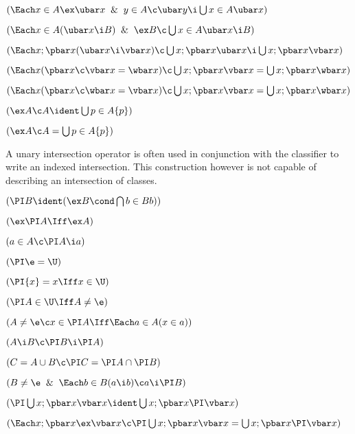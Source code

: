  $(\Each x \in A \ex\ubar x \And y \in A
\c \ubar y \i \bigcup x \in A \ubar x)$

 $(\Each x \in A (\ubar x \i B) \And \ex B
\c \bigcup x \in A \ubar x \i B)$

 $(\Each x ;\pbar x (\ubar x \i \vbar x )\c \bigcup x ; \pbar x \ubar x \i \bigcup x; \pbar x \vbar x)$


 $(\Each x (\pbar x \c \vbar x = \wbar x )\c \bigcup x ; \pbar x \vbar x = \bigcup x; \pbar x \wbar x)$

 $(\Each x (\pbar x \c \wbar x = \vbar x )\c \bigcup x ; \pbar x \vbar x = \bigcup x; \pbar x \wbar x)$

 $(\ex A \c A \ident \bigcup p \in A \{p\})$

 $(\ex A \c A = \bigcup p \in A \{p\})$
\lineb


A unary intersection operator is often used in conjunction with the
classifier to write an indexed intersection.  This construction however
is not capable of describing an intersection of classes.
\lineb


 $(\PI B \ident (\ex B \cond \bigcap b \in B b))$


 $(\ex \PI A \Iff \ex A )$

 $(a \in A \c \PI A \i a)$

 $(\PI \e = \U)$

 $(\PI\{x\} = x \Iff x \in \U)$

 $(\PI A \in \U \Iff A \ne \e)$

 $(A \ne \e \c x \in \PI A \Iff \Each a \in A(x \in a))$ 

 $(A \i B \c \PI B \i \PI A)$

 $(C = A \cup B \c \PI C = \PI A \cap \PI B)$

 $(B \ne \e \And \Each b \in B(a \i b) \c a \i \PI B)$

 $(\PI\bigcup x ;\pbar x \vbar x \ident \bigcup x ;\pbar x \PI\vbar x)$

 $(\Each x;\pbar x\ex\vbar x \c 
	\PI\bigcup x ;\pbar x \vbar x = \bigcup x ;\pbar x \PI\vbar x)$
\lineb


